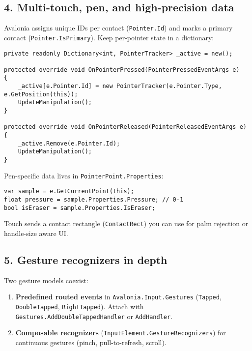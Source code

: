 \subsection{4. Multi-touch, pen, and high-precision
data}\label{multi-touch-pen-and-high-precision-data}

Avalonia assigns unique IDs per contact
(\passthrough{\lstinline!Pointer.Id!}) and marks a primary contact
(\passthrough{\lstinline!Pointer.IsPrimary!}). Keep per-pointer state in
a dictionary:

\begin{lstlisting}
private readonly Dictionary<int, PointerTracker> _active = new();

protected override void OnPointerPressed(PointerPressedEventArgs e)
{
    _active[e.Pointer.Id] = new PointerTracker(e.Pointer.Type, e.GetPosition(this));
    UpdateManipulation();
}

protected override void OnPointerReleased(PointerReleasedEventArgs e)
{
    _active.Remove(e.Pointer.Id);
    UpdateManipulation();
}
\end{lstlisting}

Pen-specific data lives in
\passthrough{\lstinline!PointerPoint.Properties!}:

\begin{lstlisting}
var sample = e.GetCurrentPoint(this);
float pressure = sample.Properties.Pressure; // 0-1
bool isEraser = sample.Properties.IsEraser;
\end{lstlisting}

Touch sends a contact rectangle (\passthrough{\lstinline!ContactRect!})
you can use for palm rejection or handle-size aware UI.

\subsection{5. Gesture recognizers in
depth}\label{gesture-recognizers-in-depth}

Two gesture models coexist:

\begin{enumerate}
\def\labelenumi{\arabic{enumi}.}
\tightlist
\item
  \textbf{Predefined routed events} in
  \passthrough{\lstinline!Avalonia.Input.Gestures!}
  (\passthrough{\lstinline!Tapped!},
  \passthrough{\lstinline!DoubleTapped!},
  \passthrough{\lstinline!RightTapped!}). Attach with
  \passthrough{\lstinline!Gestures.AddDoubleTappedHandler!} or
  \passthrough{\lstinline!AddHandler!}.
\item
  \textbf{Composable recognizers}
  (\passthrough{\lstinline!InputElement.GestureRecognizers!}) for
  continuous gestures (pinch, pull-to-refresh, scroll).
\end{enumerate}

